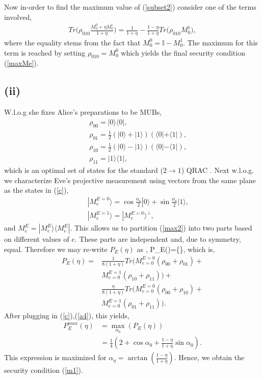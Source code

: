 Now in-order to find the maximum value of (\ref{subset2}) consider one of the terms involved,
\begin{equation}
\begin{split}
Tr\bigg(\rho_{010}\frac{M_0^0 + \eta M_0^1}{1+\eta}\bigg) = \frac{1}{1+\eta} - \frac{1-\eta}{1+\eta}Tr\bigg(\rho_{010}M_0^1\bigg),
\end{split}
\end{equation}
where the equality stems from the fact that $M_0^0=\mathbb{I}-M_0^1$.
The maximum for this term is reached by setting $\rho_{010}=M_0^0$ which yields the final security condition (\ref{maxMe}).
\subsection*{(ii)}
W.l.o.g she fixes Alice's preparations to be MUBs,
\begin{eqnarray}
&& \rho_{00}=|0\rangle\langle0|, \nonumber \\
&& \rho_{01}=\frac{1}{2}(|0\rangle+|1\rangle)(\langle0|+\langle1|), \nonumber \\
&& \rho_{10}=\frac{1}{2}(|0\rangle-|1\rangle)(\langle0|-\langle1|), \nonumber \\
&& \rho_{11}=|1\rangle\langle 1|, \label{c}
\end{eqnarray}
which is an optimal set of states for the standard ($2\to1$) QRAC \cite{Am2}. Next w.l.o.g. we characterize Eve's projective measurement using vectors from the same plane as the states in (\ref{c}),
\begin{eqnarray}
&& |M_e^{E=0}\rangle=\cos\frac{\alpha_e}{2}|0\rangle+\sin\frac{\alpha_e}{2}|1\rangle, \nonumber \\
&& |M_e^{E=1}\rangle = |M_e^{E=0}\rangle^\perp \label{a4},
\end{eqnarray}
and $M_e^{E}=|M_e^E\rangle\langle M_e^E|$. This allows us to partition (\ref{max2}) into two parts based on different values of $e$. These parts are independent and, due to symmetry, equal. Therefore we may re-write $P_E(\eta)$ as ,
\be
P_E(\eta)=\max\left\{\right\},
\ee 
which is,
\begin{equation}
\begin{split}
P_E(\eta)= &
\frac{1}{8(1+\eta)}Tr\bigg(M_{e=0}^{E=0}(\rho_{00}+\rho_{01})+ \\ & M_{e=0}^{E=1}(\rho_{10}+\rho_{11})\bigg)
+ \\& \frac{\eta}{8(1+\eta)} Tr\bigg(M_{e=0}^{E=0}(\rho_{00}+\rho_{10})+ \\ & M_{e=0}^{E=1}(\rho_{01}+\rho_{11})\bigg).
\end{split}
\end{equation}
After plugging in (\ref{c}),(\ref{a4}), this yields,
\begin{equation}
\begin{split}
P_E^{max}(\eta)& =\max_{\alpha_0}(P_E(\eta)) \\ & = \frac{1}{4}\left(2+\cos \alpha_0+\frac{1-\eta}{1+\eta}\sin\alpha_0\right).
\end{split}
\end{equation}
This expression is maximized for $\alpha_\eta=\arctan\left(\frac{1-\eta}{1+\eta}\right)$. Hence, we obtain the security condition (\ref{m1}).
